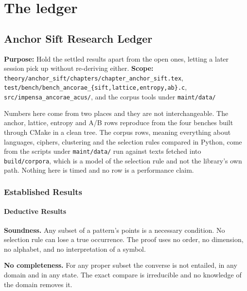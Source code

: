 \chapter{The ledger}

\section{Anchor Sift Research Ledger}

\textbf{Purpose:} Hold the settled results apart from the open ones, letting a later session pick up without re-deriving either. \textbf{Scope:} \texttt{theory/\allowbreak{}anchor\_\allowbreak{}sift/\allowbreak{}chapters/\allowbreak{}chapter\_\allowbreak{}anchor\_\allowbreak{}sift.\allowbreak{}tex}, \texttt{test/\allowbreak{}bench/\allowbreak{}bench\_\allowbreak{}ancorae\_\allowbreak{}\{sift,lattice,entropy,ab\}.\allowbreak{}c}, \texttt{src/\allowbreak{}impensa\_\allowbreak{}ancorae\_\allowbreak{}acus/\allowbreak{}}, and the corpus tools under \texttt{maint/\allowbreak{}data/\allowbreak{}}

Numbers here come from two places and they are not interchangeable. The anchor, lattice, entropy and A/B rows reproduce from the four benches built through CMake in a clean tree. The corpus rows, meaning everything about languages, ciphers, clustering and the selection rules compared in Python, come from the scripts under \texttt{maint/\allowbreak{}data/\allowbreak{}} run against texts fetched into \texttt{build/\allowbreak{}corpora}, which is a model of the selection rule and not the library's own path. Nothing here is timed and no row is a performance claim.

\subsection{Established Results}

\subsubsection{Deductive Results}

\textbf{Soundness.} Any subset of a pattern's points is a necessary condition. No selection rule can lose a true occurrence. The proof uses no order, no dimension, no alphabet, and no interpretation of a symbol.

\textbf{No completeness.} For any proper subset the converse is not entailed, in any domain and in any state. The exact compare is irreducible and no knowledge of the domain removes it.

